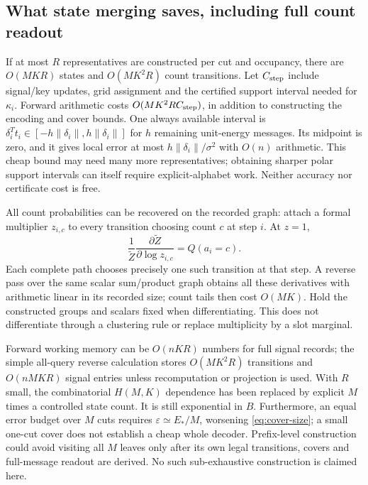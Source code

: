 \documentclass[10pt,a4paper]{article}
\begin{document}
\subsection{What state merging saves, including full count readout}
If at most $R$ representatives are constructed per cut and occupancy, there are $O(MKR)$ states and
$O(MK^2R)$ count transitions. Let $C_{\rm step}$ include signal/key updates, grid assignment and the
certified support interval needed for $\kappa_i$. Forward arithmetic costs
$O(MK^2R C_{\rm step})$, in addition to constructing the encoding and cover bounds.
One always available interval is $\delta_i^Tt_i\in[-h\|\delta_i\|,h\|\delta_i\|]$ for $h$ remaining
unit-energy messages. Its midpoint is zero, and it gives local error at most $h\|\delta_i\|/\sigma^2$
with $O(n)$ arithmetic. This cheap bound may need many more representatives; obtaining sharper polar
support intervals can itself require explicit-alphabet work. Neither accuracy nor certificate cost is free.

All count probabilities can be recovered on the recorded graph: attach a formal multiplier $z_{i,c}$ to
every transition choosing count $c$ at step $i$. At $z=1$,
\[
 \frac{1}{\widetilde Z}\frac{\partial\widetilde Z}{\partial\log z_{i,c}}
 =Q(a_i=c).
\]
Each complete path chooses precisely one such transition at that step. A reverse pass over the same scalar
sum/product graph obtains all these derivatives with arithmetic linear in its recorded size; count tails
then cost $O(MK)$. Hold the constructed groups and scalars fixed when differentiating. This does not
differentiate through a clustering rule or replace multiplicity by a slot marginal.

Forward working memory can be $O(nKR)$ numbers for full signal records; the simple all-query reverse calculation
stores $O(MK^2R)$ transitions and $O(nMKR)$ signal entries unless recomputation or projection is used. With $R$ small, the
combinatorial $H(M,K)$ dependence has been replaced by explicit $M$ times a controlled state count.
It is still exponential in $B$. Furthermore, an equal error budget over $M$ cuts requires
$\varepsilon\simeq E_*/M$, worsening \eqref{eq:cover-size}; a small one-cut cover does not establish a cheap
whole decoder. Prefix-level construction could avoid visiting all $M$ leaves only after its own legal
transitions, covers and full-message readout are derived. No such sub-exhaustive construction is claimed here.
\end{document}
